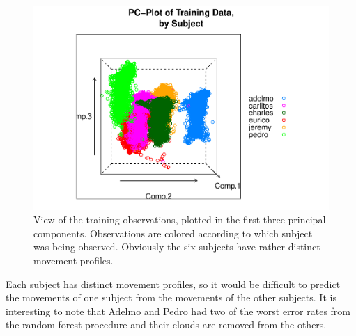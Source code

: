 \documentclass[12pt,twoside]{reedthesis}
\begin{document}
  \begin{Shaded}
  \begin{Highlighting}[]
   \NormalTok{~}\StringTok{ } \NormalTok{*}\StringTok{ }\NormalTok{, } 
         \NormalTok{(} \NormalTok{, } \NormalTok{, } \NormalTok{),}
         \NormalTok{(} \NormalTok{),}
         \NormalTok{)}
  \end{Highlighting}
  \end{Shaded}
  
  \begin{figure}
  
  {\centering \includegraphics{A_Random_Forest_Model_for_Computer-Assisted_Activity-Recognition_files/figure-latex/unnamed-chunk-53-1} 
  
  }
  
  \caption[View of the training observations, plotted in the first three principal components]{View of the training observations, plotted in the first three principal components.  Observations are colored according to which subject was being observed.  Obviously the six subjects have rather distinct movement profiles.}\label{fig:unnamed-chunk-53}
  \end{figure}
  
  Each subject has distinct movement profiles, so it would be difficult to
  predict the movements of one subject from the movements of the other
  subjects. It is interesting to note that Adelmo and Pedro had two of the
  worst error rates from the random forest procedure and their clouds are
  removed from the others. \appendix
  
\end{document}
